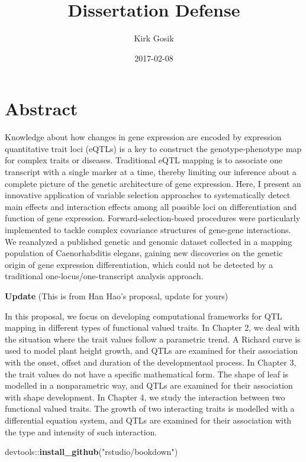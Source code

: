 \documentclass[]{book}
\title{Dissertation Defense}
\author{Kirk Gosik}
\date{2017-02-08}
\newenvironment{Shaded}{\begin{snugshade}}{\end{snugshade}}
\newcommand{\KeywordTok}[1]{\textcolor[rgb]{0.13,0.29,0.53}{\textbf{{#1}}}}
\newcommand{\StringTok}[1]{\textcolor[rgb]{0.31,0.60,0.02}{{#1}}}
\newcommand{\NormalTok}[1]{{#1}}
\theoremstyle{definition}
\theoremstyle{definition}
\theoremstyle{remark}
\begin{document}
\maketitle

{
\setcounter{tocdepth}{1}
\tableofcontents
}
\chapter*{Abstract}\label{abstract}

Knowledge about how changes in gene expression are encoded by expression
quantitative trait loci (eQTLs) is a key to construct the
genotype-phenotype map for complex traits or diseases. Traditional eQTL
mapping is to associate one transcript with a single marker at a time,
thereby limiting our inference about a complete picture of the genetic
architecture of gene expression. Here, I present an innovative
application of variable selection approaches to systematically detect
main effects and interaction effects among all possible loci on
differentiation and function of gene expression. Forward-selection-based
procedures were particularly implemented to tackle complex covariance
structures of gene-gene interactions. We reanalyzed a published genetic
and genomic dataset collected in a mapping population of Caenorhabditis
elegans, gaining new discoveries on the genetic origin of gene
expression differentiation, which could not be detected by a traditional
one-locus/one-transcript analysis approach.

\textbf{Update} (This is from Han Hao's proposal, update for yours)

In this proposal, we focus on developing computational frameworks for
QTL mapping in different types of functional valued traits. In Chapter
2, we deal with the situation where the trait values follow a parametric
trend. A Richard curve is used to model plant height growth, and QTLs
are examined for their association with the onset, offset and duration
of the developmentaol process. In Chapter 3, the trait values do not
have a specific mathematical form. The shape of leaf is modelled in a
nonparametric way, and QTLs are examined for their association with
shape development. In Chapter 4, we study the interaction between two
functional valued traits. The growth of two interacting traits is
modelled with a differential equation system, and QTLs are examined for
their association with the type and intensity of such interaction.

\begin{Shaded}
\begin{Highlighting}[]
\NormalTok{devtools::}\KeywordTok{install_github}\NormalTok{(}\StringTok{"rstudio/bookdown"}\NormalTok{)}
\end{Highlighting}
\end{Shaded}
\end{document}
